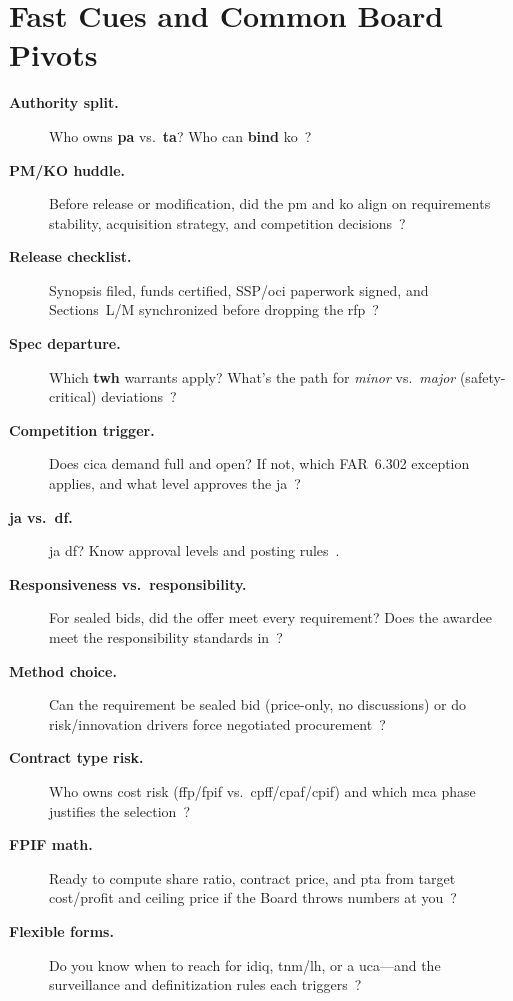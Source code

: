 \documentclass[../main.tex]{subfiles}
\begin{document}
\section{Fast Cues and Common Board Pivots}
\begin{description}
  \item[\textbf{Authority split.}] Who owns \textbf{\ac{pa}} vs.\ \textbf{\ac{ta}}? Who can \textbf{bind} \ac{ko}~\autocite{SECNAV5400-15D,SECNAV5000-2G,FAR}?
  \item[\textbf{PM/KO huddle.}] Before release or modification, did the \ac{pm} and \ac{ko} align on requirements stability, acquisition strategy, and competition decisions~\autocite{DoDI5000-85,edo-3-2-1-intro-contracting-2025}?
  \item[\textbf{Release checklist.}] Synopsis filed, funds certified, SSP/\ac{oci} paperwork signed, and Sections~L/M synchronized before dropping the \ac{rfp}~\autocite{FAR,NAVSEA-Source-Selection-Guide-2022,edo-3-2-2-solicitation-prep-2025}?
  \item[\textbf{Spec departure.}] Which \textbf{\ac{twh}} warrants apply? What's the path for \emph{minor} vs.\ \emph{major} (safety-critical) deviations~\autocite{SECNAV5400-15D}?
  \item[\textbf{Competition trigger.}] Does \ac{cica} demand full and open? If not, which FAR~6.302 exception applies, and what level approves the \acrshort{ja}~\autocite{USC-3201-CICA,FAR}?
  \item[\textbf{\acrshort{ja} vs.\ \acrshort{df}.}] \ac{ja} \ac{df}? Know approval levels and posting rules~\autocite{FAR}.
  \item[\textbf{Responsiveness vs.\ responsibility.}] For sealed bids, did the offer meet every requirement? Does the awardee meet the responsibility standards in~\autocite[\S~9.104]{FAR}?
  \item[\textbf{Method choice.}] Can the requirement be sealed bid (price-only, no discussions) or do risk/innovation drivers force negotiated procurement~\autocite{FAR,NAVSEA-Source-Selection-Guide-2022}?
  \item[\textbf{Contract type risk.}] Who owns cost risk (\ac{ffp}/\ac{fpif} vs.\ \ac{cpff}/\ac{cpaf}/\ac{cpif}) and which \ac{mca} phase justifies the selection~\autocite{FAR,DoDI5000-85}?
  \item[\textbf{FPIF math.}] Ready to compute share ratio, contract price, and \ac{pta} from target cost/profit and ceiling price if the Board throws numbers at you~\autocite{FAR,NAVSEA-Contracts-Handbook-2023}?
  \item[\textbf{Flexible forms.}] Do you know when to reach for \ac{idiq}, \ac{tnm}/\ac{lh}, or a \ac{uca}---and the surveillance and definitization rules each triggers~\autocite{FAR,NMCARS,DFARS}?

\end{description}
\end{document}
